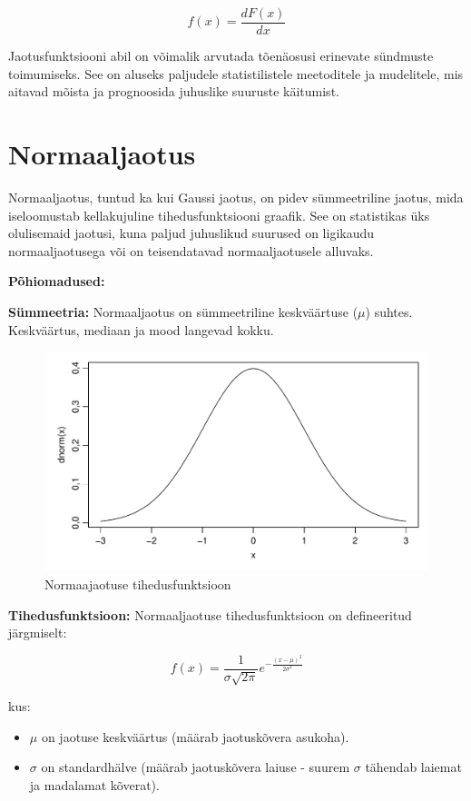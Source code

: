 \documentclass[
]{book}
\providecommand{\tightlist}{%
  \setlength{\itemsep}{0pt}\setlength{\parskip}{0pt}}
\theoremstyle{definition}
\theoremstyle{definition}
\theoremstyle{definition}
\theoremstyle{definition}
\theoremstyle{remark}
\begin{document}
\[f(x) = \frac{dF(x)}{dx}\]

Jaotusfunktsiooni abil on võimalik arvutada tõenäosusi erinevate sündmuste toimumiseks. See on aluseks paljudele statistilistele meetoditele ja mudelitele, mis aitavad mõista ja prognoosida juhuslike suuruste käitumist.

\section{Normaaljaotus}\label{normaaljaotus}

Normaaljaotus, tuntud ka kui Gaussi jaotus, on pidev sümmeetriline jaotus, mida iseloomustab kellakujuline tihedusfunktsiooni graafik. See on statistikas üks olulisemaid jaotusi, kuna paljud juhuslikud suurused on ligikaudu normaaljaotusega või on teisendatavad normaaljaotusele alluvaks.

\textbf{Põhiomadused:}

\textbf{Sümmeetria:} Normaaljaotus on sümmeetriline keskväärtuse (\(\mu\)) suhtes. Keskväärtus, mediaan ja mood langevad kokku.

\begin{figure}[H]
\includegraphics[width=0.8\linewidth]{_main_files/figure-latex/unnamed-chunk-37-1} \caption{Normaajaotuse tihedusfunktsioon}\label{fig:unnamed-chunk-37}
\end{figure}

\textbf{Tihedusfunktsioon:} Normaaljaotuse tihedusfunktsioon on defineeritud järgmiselt:

\[f(x) = \frac{1}{\sigma \sqrt{2\pi}} e^{-\frac{(x-\mu)^2}{2\sigma^2}}\]

kus:

\begin{itemize}
\tightlist
\item
  \(\mu\) on jaotuse keskväärtus (määrab jaotuskõvera asukoha).
\item
  \(\sigma\) on standardhälve (määrab jaotuskõvera laiuse - suurem \(\sigma\) tähendab laiemat ja madalamat kõverat).
\end{itemize}
\end{document}
